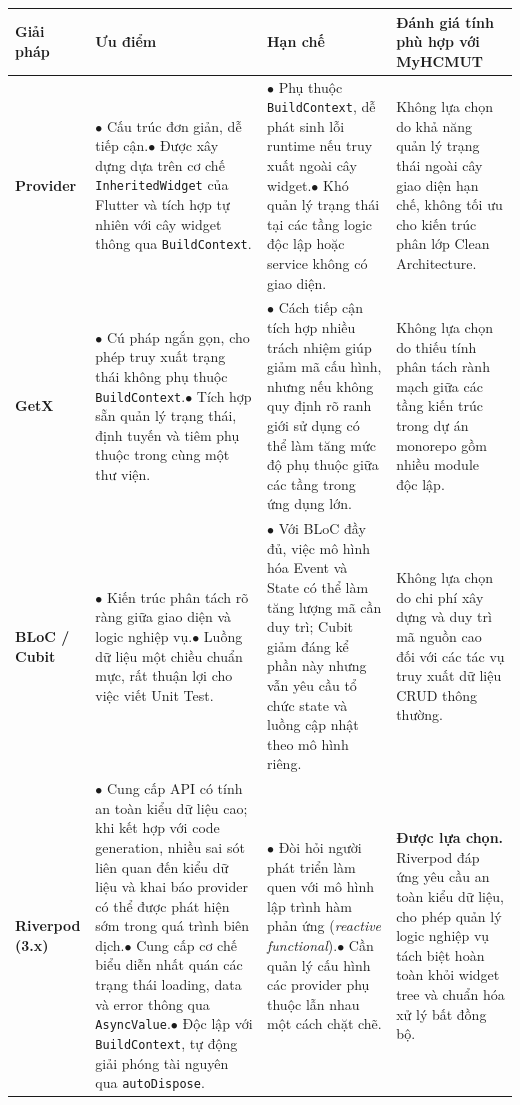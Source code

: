 \begin{table}[H]
    \centering
    \small
    \renewcommand{\arraystretch}{1.25}
    \begin{tabularx}{\textwidth}{|L{2.5cm}|Y|Y|L{3.3cm}|}
    \hline
    \textbf{Giải pháp} & \textbf{Ưu điểm} & \textbf{Hạn chế} & \textbf{Đánh giá tính phù hợp với MyHCMUT} \\
    \hline
    \textbf{Provider} & $\bullet$ Cấu trúc đơn giản, dễ tiếp cận.\newline $\bullet$ Được xây dựng dựa trên cơ chế \texttt{InheritedWidget} của Flutter và tích hợp tự nhiên với cây widget thông qua \texttt{BuildContext}. & $\bullet$ Phụ thuộc \texttt{BuildContext}, dễ phát sinh lỗi runtime nếu truy xuất ngoài cây widget.\newline $\bullet$ Khó quản lý trạng thái tại các tầng logic độc lập hoặc service không có giao diện. & Không lựa chọn do khả năng quản lý trạng thái ngoài cây giao diện hạn chế, không tối ưu cho kiến trúc phân lớp Clean Architecture. \\
    \hline
    \textbf{GetX} & $\bullet$ Cú pháp ngắn gọn, cho phép truy xuất trạng thái không phụ thuộc \texttt{BuildContext}.\newline $\bullet$ Tích hợp sẵn quản lý trạng thái, định tuyến và tiêm phụ thuộc trong cùng một thư viện. & $\bullet$ Cách tiếp cận tích hợp nhiều trách nhiệm giúp giảm mã cấu hình, nhưng nếu không quy định rõ ranh giới sử dụng có thể làm tăng mức độ phụ thuộc giữa các tầng trong ứng dụng lớn. & Không lựa chọn do thiếu tính phân tách rành mạch giữa các tầng kiến trúc trong dự án monorepo gồm nhiều module độc lập. \\
    \hline
    \textbf{BLoC / Cubit} & $\bullet$ Kiến trúc phân tách rõ ràng giữa giao diện và logic nghiệp vụ.\newline $\bullet$ Luồng dữ liệu một chiều chuẩn mực, rất thuận lợi cho việc viết Unit Test. & $\bullet$ Với BLoC đầy đủ, việc mô hình hóa Event và State có thể làm tăng lượng mã cần duy trì; Cubit giảm đáng kể phần này nhưng vẫn yêu cầu tổ chức state và luồng cập nhật theo mô hình riêng. & Không lựa chọn do chi phí xây dựng và duy trì mã nguồn cao đối với các tác vụ truy xuất dữ liệu CRUD thông thường. \\
    \hline
    \textbf{Riverpod (3.x)} & $\bullet$ Cung cấp API có tính an toàn kiểu dữ liệu cao; khi kết hợp với code generation, nhiều sai sót liên quan đến kiểu dữ liệu và khai báo provider có thể được phát hiện sớm trong quá trình biên dịch.\newline $\bullet$ Cung cấp cơ chế biểu diễn nhất quán các trạng thái loading, data và error thông qua \texttt{AsyncValue}.\newline $\bullet$ Độc lập với \texttt{BuildContext}, tự động giải phóng tài nguyên qua \texttt{autoDispose}. & $\bullet$ Đòi hỏi người phát triển làm quen với mô hình lập trình hàm phản ứng (\textit{reactive functional}).\newline $\bullet$ Cần quản lý cấu hình các provider phụ thuộc lẫn nhau một cách chặt chẽ. & \textbf{Được lựa chọn.} Riverpod \cite{riverpod_doc} đáp ứng yêu cầu an toàn kiểu dữ liệu, cho phép quản lý logic nghiệp vụ tách biệt hoàn toàn khỏi widget tree và chuẩn hóa xử lý bất đồng bộ. \\

\end{tabularx}
\end{table}
